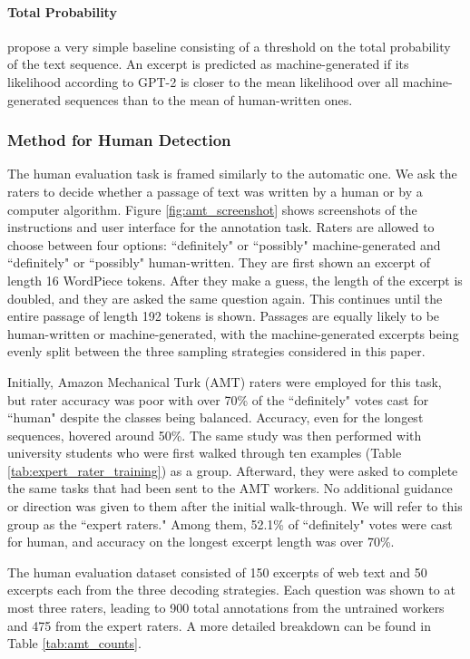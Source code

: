 \paragraph{Total Probability}
\citet{solaiman2019release} propose a very simple baseline consisting of a threshold on the total probability of the text sequence.
An excerpt is predicted as machine-generated if its likelihood according to GPT-2 is closer to the mean likelihood over all machine-generated sequences than to the mean of human-written ones.

\subsubsection{Method for Human Detection}
The human evaluation task is framed similarly to the automatic one.
We ask the raters to decide whether a passage of text was written by a human or by a computer algorithm.
Figure \ref{fig:amt_screenshot} shows screenshots of the instructions and user interface for the annotation task.
Raters are allowed to choose between four options: ``definitely" or ``possibly" machine-generated and  ``definitely" or ``possibly" human-written.
They are first shown an excerpt of length 16 WordPiece tokens.
After they make a guess, the length of the excerpt is doubled, and they are asked the same question again.
This continues until the entire passage of length 192 tokens is shown.
Passages are equally likely to be human-written or machine-generated, with the machine-generated excerpts being evenly split between the three sampling strategies considered in this paper.

Initially, Amazon Mechanical Turk (AMT) raters were employed for this task, but rater accuracy was poor with over 70\% of the ``definitely" votes cast for ``human" despite the classes being balanced.
Accuracy, even for the longest sequences, hovered around 50\%.
The same study was then performed with university students who were first walked through ten examples (Table \ref{tab:expert_rater_training}) as a group.
Afterward, they were asked to complete the same tasks that had been sent to the AMT workers.
No additional guidance or direction was given to them after the initial walk-through.
We will refer to this group as the ``expert raters."
Among them, 52.1\% of ``definitely" votes were cast for human, and accuracy on the longest excerpt length was over 70\%.

The human evaluation dataset consisted of 150 excerpts of web text and 50 excerpts each from the three decoding strategies.
Each question was shown to at most three raters, leading to 900 total annotations from the untrained workers and 475 from the expert raters.
A more detailed breakdown can be found in Table \ref{tab:amt_counts}.


